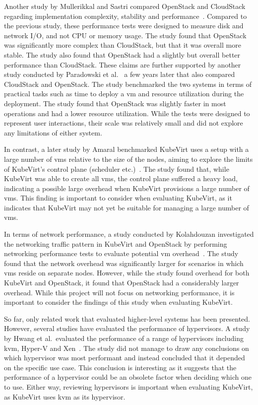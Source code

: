 \documentclass{kththesis}
\begin{document}
Another study by Mullerikkal and Sastri compared OpenStack and CloudStack regarding implementation complexity, stability and performance\ \cite{cs-os-comparison-2009}. Compared to the previous study, these performance tests were designed to measure disk and network I/O, and not CPU or memory usage. The study found that OpenStack was significantly more complex than CloudStack, but that it was overall more stable. The study also found that OpenStack had a slightly but overall better performance than CloudStack. These claims are further supported by another study conducted by Paradowski et al.\ \cite{cs-os-comparison-2013} a few years later that also compared CloudStack and OpenStack. The study benchmarked the two systems in terms of practical tasks such as time to deploy a \Gls{vm} and resource utilization during the deployment. The study found that OpenStack was slightly faster in most operations and had a lower resource utilization. While the tests were designed to represent user interactions, their scale was relatively small and did not explore any limitations of either system. 

In contrast, a later study by Amaral benchmarked KubeVirt uses a setup with a large number of \Glspl{vm} relative to the size of the nodes, aiming to explore the limits of KubeVirt's control plane (scheduler etc.)\ \cite{ibm-kubevirt-scale}. The study found that, while KubeVirt was able to create all \Glspl{vm}, the control plane suffered a heavy load, indicating a possible large overhead when KubeVirt provisions a large number of \Glspl{vm}. This finding is important to consider when evaluating KubeVirt, as it indicates that KubeVirt may not yet be suitable for managing a large number of \Glspl{vm}.

In terms of network performance, a study conducted by Kolahdouzan investigated the networking traffic pattern in KubeVirt and OpenStack by performing networking performance tests to evaluate potential \Gls{vm} overhead\ \cite{kubevirt-openstack-network}. The study found that the network overhead was significantly larger for scenarios in which \Glspl{vm} reside on separate nodes. However, while the study found overhead for both KubeVirt and OpenStack, it found that OpenStack had a considerably larger overhead. While this project will not focus on networking performance, it is important to consider the findings of this study when evaluating KubeVirt.

So far, only related work that evaluated higher-level systems has been presented. However, several studies have evaluated the performance of hypervisors. A study by Hwang et al.\ evaluated the performance of a range of hypervisors including \Gls{kvm}, Hyper-V and Xen\ \cite{hypervisor-comparion-2010}. The study did not manage to draw any conclusions on which hypervisor was most performant and instead concluded that it depended on the specific use case. This conclusion is interesting as it suggests that the performance of a hypervisor could be an obsolete factor when deciding which one to use. Either way, reviewing hypervisors is important when evaluating KubeVirt, as KubeVirt uses \Gls{kvm} as its hypervisor. 
\end{document}
